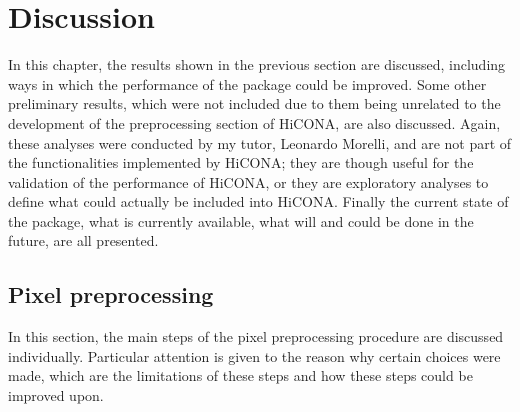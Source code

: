 \graphicspath{{chapters/06_discussion/images}}
\chapter{Discussion}


In this chapter, the results shown in the previous section are discussed, including ways in which the performance of the package could be improved. Some other preliminary results, which were not included due to them being unrelated to the development of the preprocessing section of HiCONA, are also discussed. Again, these analyses were conducted by my tutor, Leonardo Morelli, and are not part of the functionalities implemented by HiCONA; they are though useful for the validation of the performance of HiCONA, or they are exploratory analyses to define what could actually be included into HiCONA. Finally the current state of the package, what is currently available, what will and could be done in the future, are all presented.



\section{Pixel preprocessing}
In this section, the main steps of the pixel preprocessing procedure are discussed individually. Particular attention is given to the reason why certain choices were made, which are the limitations of these steps and how these steps could be improved upon.


